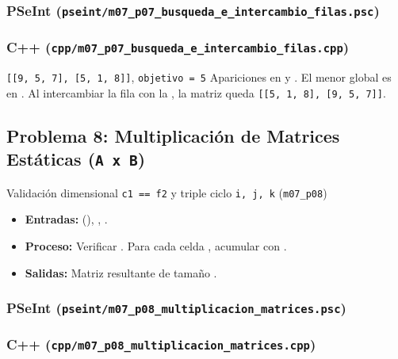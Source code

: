 \documentclass[11pt,letterpaper]{article}
\begin{document}
\subsubsection*{PSeInt (\texttt{pseint/m07\_p07\_busqueda\_e\_intercambio\_filas.psc})}


\subsubsection*{C++ (\texttt{cpp/m07\_p07\_busqueda\_e\_intercambio\_filas.cpp})}


\begin{pruebaescritorio}{\texttt{[[9, 5, 7], [5, 1, 8]]}, \texttt{objetivo = 5}}
Apariciones en  y . El menor global es  en . Al intercambiar la fila  con la , la matriz queda \texttt{[[5, 1, 8], [9, 5, 7]]}.
\end{pruebaescritorio}

\subsection{Problema 8: Multiplicación de Matrices Estáticas (\texttt{A x B})}
\begin{analisis}{Validación dimensional \texttt{c1 == f2} y triple ciclo \texttt{i, j, k} (\texttt{m07\_p08})}
\begin{itemize}
  \item \textbf{Entradas:}  (), , .
  \item \textbf{Proceso:} Verificar . Para cada celda , acumular  con .
  \item \textbf{Salidas:} Matriz resultante  de tamaño .
\end{itemize}
\end{analisis}

\subsubsection*{PSeInt (\texttt{pseint/m07\_p08\_multiplicacion\_matrices.psc})}


\subsubsection*{C++ (\texttt{cpp/m07\_p08\_multiplicacion\_matrices.cpp})}

\end{document}
